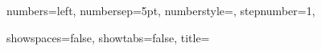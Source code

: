 {		numbers=left,                    %
		numbersep=5pt,                   %
		numberstyle=\tiny\color{myGray}, %
		stepnumber=1,                    %

		showspaces=false,                %
		showtabs=false,                  %
		title={\protect\filename@parse{\lstname}\protect\filename@base{}\protect\filename@ext}	 %
	}
